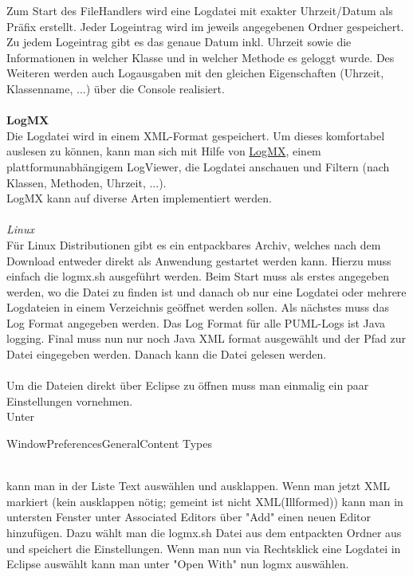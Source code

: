 Zum Start des FileHandlers wird eine Logdatei mit exakter Uhrzeit/Datum als Präfix erstellt.
Jeder Logeintrag wird im jeweils angegebenen Ordner gespeichert. Zu jedem Logeintrag gibt es das genaue Datum inkl. Uhrzeit sowie die Informationen in welcher Klasse und in welcher Methode es geloggt wurde.
Des Weiteren werden auch Logausgaben mit den gleichen Eigenschaften (Uhrzeit, Klassenname, ...) über die Console realisiert.\\\\
\textbf{LogMX}\\
Die Logdatei wird in einem XML-Format gespeichert. Um dieses komfortabel auslesen zu können, kann man sich mit Hilfe von
\href{https://logmx.com/download}{LogMX}, einem plattformunabhängigem LogViewer, die Logdatei anschauen und Filtern (nach Klassen, Methoden, Uhrzeit, ...). \\
LogMX kann auf diverse Arten implementiert werden.\\\\
\emph{Linux}\\
Für Linux Distributionen gibt es ein entpackbares Archiv, welches nach dem Download entweder direkt als Anwendung gestartet werden kann. Hierzu muss einfach die logmx.sh ausgeführt werden. Beim Start muss als erstes angegeben werden, wo die Datei zu finden ist und danach ob nur eine Logdatei oder mehrere Logdateien in einem Verzeichnis geöffnet werden sollen. Als nächstes muss das Log Format angegeben werden. Das Log Format für alle PUML-Logs ist Java logging. Final muss nun nur noch Java XML format ausgewählt und der Pfad zur Datei eingegeben werden. Danach kann die Datei gelesen werden.\\\\
Um die Dateien direkt über Eclipse zu öffnen muss man einmalig ein paar Einstellungen vornehmen.\\
Unter
\begin{center}
\rightarrow Window\rightarrow Preferences\rightarrow General\rightarrow Content Types
\end{center}
\\kann man in der Liste Text auswählen und ausklappen. Wenn man jetzt XML markiert (kein ausklappen nötig; gemeint ist nicht XML(Illformed)) kann man in untersten Fenster unter Associated Editors über "Add" einen neuen Editor hinzufügen. Dazu wählt man die logmx.sh Datei aus dem entpackten Ordner aus und speichert die Einstellungen. Wenn man nun via Rechtsklick eine Logdatei in Eclipse auswählt kann man unter "Open With" nun logmx auswählen.\\\\
